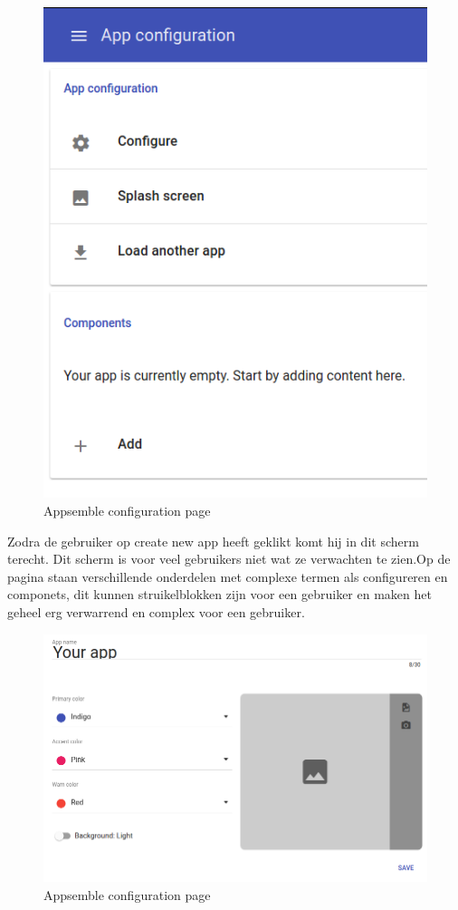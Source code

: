 \begin{figure}[H]
	\centering
	\includegraphics[scale=0.3]{images/appsemble_configuration_page}
	\caption{Appsemble configuration page}
\end{figure}
Zodra de gebruiker op create new app heeft geklikt komt hij in dit scherm terecht. Dit scherm is voor veel gebruikers niet wat ze verwachten te zien.Op de pagina staan verschillende onderdelen met complexe termen als configureren en componets, dit kunnen struikelblokken zijn voor een gebruiker en maken het geheel erg verwarrend en complex voor een gebruiker.\\
\newline
\begin{figure}[H]
	\centering
	\includegraphics[scale=0.3]{images/appsemble_configure_page}
	\caption{Appsemble configuration page}
\end{figure}
